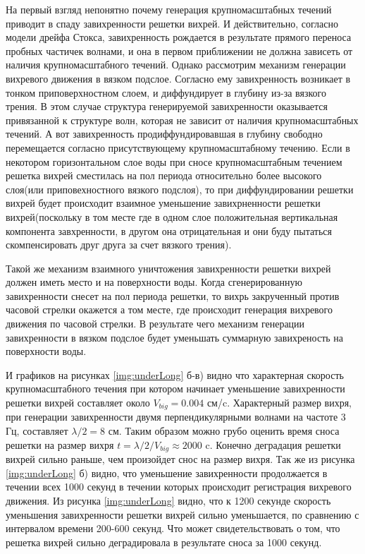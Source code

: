 На первый взгляд непонятно почему генерация крупномасштабных течений приводит в спаду завихренности решетки вихрей. И действительно, согласно модели дрейфа Стокса, завихренность рождается в результате прямого переноса пробных частичек волнами, и она в первом приближении не должна зависеть от наличия крупномасштабного течений. Однако рассмотрим механизм генерации вихревого движения в вязком подслое. Согласно ему завихренность возникает в тонком приповерхностном слоем, и диффундирует в глубину из-за вязкого трения. В этом случае структура генерируемой завихренности оказывается привязанной к структуре волн, которая не зависит от наличия крупномасштабных течений. А вот завихренность продиффундировавшая в глубину свободно перемещается согласно присутствующему крупномасштабному течению. Если в некотором горизонтальном слое воды при сносе крупномасштабным течением решетка вихрей сместилась на пол периода относительно более высокого слоя(или приповехностного вязкого подслоя), то при диффундировании решетки вихрей будет происходит взаимное уменьшение завихрненности решетки вихрей(поскольку в том месте где в одном слое положительная вертикальная компонента завхренности, в другом она отрицательная и они буду пытаться скомпенсировать друг друга за счет вязкого трения). 

Такой же механизм взаимного уничтожения завихренности решетки вихрей должен иметь место и на поверхности воды. Когда сгенерированную завихренности снесет на пол периода решетки, то вихрь закрученный против часовой стрелки окажется а том месте, где происходит генерация вихревого движения по часовой стрелки. В результате чего механизм генерации завихренности в вязком подслое будет уменьшать суммарную завихреность на поверхности воды.

И графиков на рисунках \ref{img:underLong} б-в) видно что характерная скорость крупномасштабного течения при котором начинает уменьшение завихренности решетки вихрей составляет около $V_{big} = 0.004$ см/c. Характерный размер вихря, при генерации завихренности двумя перпендикулярными волнами на частоте 3 Гц, составляет $\lambda/2 = 8$ см. Таким образом можно грубо оценить время сноса решетки на размер вихря $t=\lambda/2/V_{big} \approx 2000$ c. Конечно деградация решетки вихрей сильно раньше, чем произойдет снос на размер вихря. Так же из рисунка \ref{img:underLong} б) видно, что уменьшение завихренности продолжается в течении всех 1000 секунд в течении которых происходит регистрация вихревого движения. Из рисунка \ref{img:underLong} видно, что к 1200 секунде скорость уменьшения завихренности решетки вихрей сильно уменьшается, по сравнению с интервалом времени 200-600 секунд. Что может свидетельствовать о том, что решетка вихрей сильно деградировала в результате сноса за 1000 секунд.

